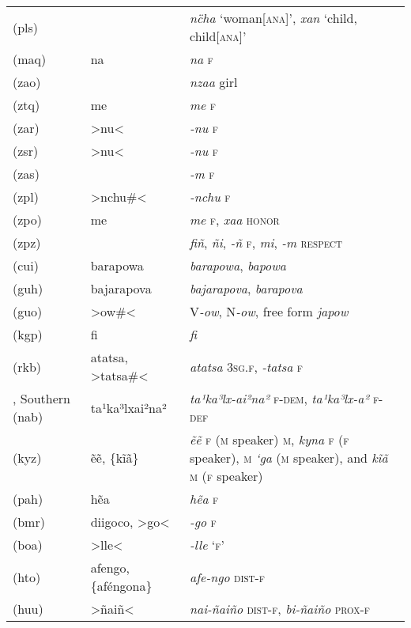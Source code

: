 {\begin{longtable}{L{.25\textwidth}L{.25\textwidth}L{.5\textwidth}}
 (pls)	&		&	\textit{nc̈ha} ‘woman[\textsc{ana}]’, \textit{xan} ‘child, child[\textsc{ana}]’	\\
 (maq)	&	na	&	\textit{na} \textsc{f}	\\
 (zao)	&		&	\textit{nzaa} girl	\\
 (ztq)	&	me	&	\textit{me} \textsc{f}	\\
 (zar)	&	>nu<	&	\textit{-nu} \textsc{f}	\\
 (zsr) 	&	>nu<	&	\textit{-nu} \textsc{f}	\\
 (zas)	&		&	\textit{-m} \textsc{f}	\\
 (zpl)	&	>nchu\#<	&	\textit{-nchu} \textsc{f}	\\
 (zpo)	&	me	&	\textit{me} \textsc{f}, \textit{xaa} \textsc{honor}	\\
 (zpz)	&		&	\textit{fiñ}, \textit{ñi}, \textit{-ñ} \textsc{f}, \textit{mi}, \textit{-m} \textsc{respect}	\\
 (cui)	&	barapowa	&	\textit{barapowa}, \textit{bapowa}	\\
 (guh)	&	bajarapova	&	\textit{bajarapova}, \textit{barapova}	\\
 (guo)	&	>ow\#<	&	V\textit{-ow}, N\textit{-ow}, free form \textit{japow}	\\
 (kgp)	&	fi	&	\textit{fi}	\\
 (rkb)	&	atatsa, >tatsa\#<	&	\textit{atatsa} \textsc{3sg.f}, \textit{-tatsa} \textsc{f}	\\
, Southern (nab)	&	ta¹ka³lxai²na²	&	\textit{ta¹ka³lx-ai²na²} \textsc{f-dem}, \textit{ta¹ka³lx-a²} \textsc{f-def}	\\
 (kyz)	&	ẽẽ, \{kĩã\}	&	\textit{ẽẽ} \textsc{f} (\textsc{m} speaker) \textsc{m}, \textit{kyna} \textsc{f} (\textsc{f} speaker), \textsc{m} \textit{‘ga} (\textsc{m} speaker), and \textit{kĩã} \textsc{m} (\textsc{f} speaker)	\\
 (pah)	&	hẽa	&	\textit{hẽa} \textsc{f}	\\
 (bmr)	&	diigoco, >go<	&	\textit{-go} \textsc{f}	\\
 (boa)	&	>lle<	&	\textit{-lle} ‘\textsc{f}’	\\
 (hto)	&	afengo, \{aféngona\}	&	\textit{afe-ngo} \textsc{dist-f}	\\
  (huu)	&	>ñaiñ<	&	\textit{nai-ñaiño} \textsc{dist-f}, \textit{bi-ñaiño} \textsc{prox-f}	\\
\end{longtable}}




